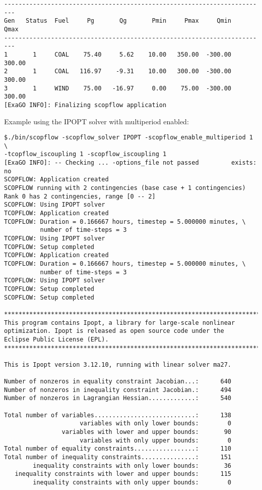 \begin{lstlisting}
-------------------------------------------------------------------------
Gen   Status  Fuel     Pg       Qg       Pmin     Pmax     Qmin     Qmax
-------------------------------------------------------------------------
1       1     COAL    75.40     5.62    10.00   350.00  -300.00   300.00
2       1     COAL   116.97    -9.31    10.00   300.00  -300.00   300.00
3       1     WIND    75.00   -16.97     0.00    75.00  -300.00   300.00
[ExaGO INFO]: Finalizing scopflow application
\end{lstlisting}

Example using the IPOPT solver with multiperiod enabled:

\begin{lstlisting}
$./bin/scopflow -scopflow_solver IPOPT -scopflow_enable_multiperiod 1 \
-tcopflow_iscoupling 1 -scopflow_iscoupling 1
[ExaGO INFO]: -- Checking ... -options_file not passed         exists: no
SCOPFLOW: Application created
SCOPFLOW running with 2 contingencies (base case + 1 contingencies)
Rank 0 has 2 contingencies, range [0 -- 2]
SCOPFLOW: Using IPOPT solver
TCOPFLOW: Application created
TCOPFLOW: Duration = 0.166667 hours, timestep = 5.000000 minutes, \
          number of time-steps = 3
TCOPFLOW: Using IPOPT solver
TCOPFLOW: Setup completed
TCOPFLOW: Application created
TCOPFLOW: Duration = 0.166667 hours, timestep = 5.000000 minutes, \
          number of time-steps = 3
TCOPFLOW: Using IPOPT solver
TCOPFLOW: Setup completed
SCOPFLOW: Setup completed

*************************************************************************
This program contains Ipopt, a library for large-scale nonlinear 
optimization. Ipopt is released as open source code under the 
Eclipse Public License (EPL).
*************************************************************************

This is Ipopt version 3.12.10, running with linear solver ma27.

Number of nonzeros in equality constraint Jacobian...:      640
Number of nonzeros in inequality constraint Jacobian.:      494
Number of nonzeros in Lagrangian Hessian.............:      540

Total number of variables............................:      138
                     variables with only lower bounds:        0
                variables with lower and upper bounds:       90
                     variables with only upper bounds:        0
Total number of equality constraints.................:      110
Total number of inequality constraints...............:      151
        inequality constraints with only lower bounds:       36
   inequality constraints with lower and upper bounds:      115
        inequality constraints with only upper bounds:        0


\end{lstlisting}
